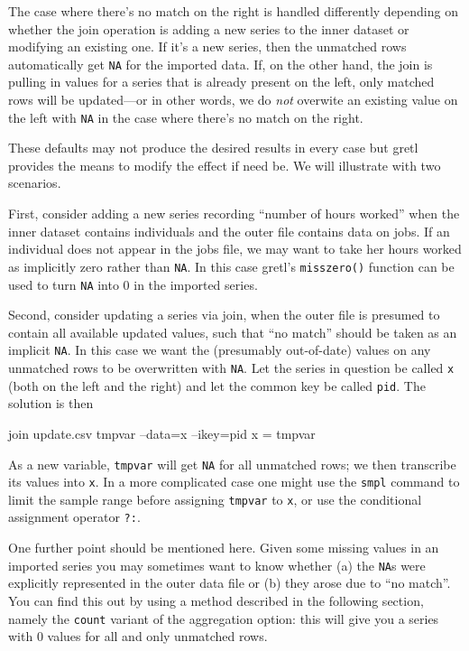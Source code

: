 The case where there's no match on the right is handled differently
depending on whether the join operation is adding a new series to the
inner dataset or modifying an existing one. If it's a new series, then
the unmatched rows automatically get \texttt{NA} for the imported
data. If, on the other hand, the join is pulling in values for a
series that is already present on the left, only matched rows will be
updated---or in other words, we do \textit{not} overwite an existing
value on the left with \texttt{NA} in the case where there's no match
on the right.

These defaults may not produce the desired results in every case but
gretl provides the means to modify the effect if need be.  We will
illustrate with two scenarios.

First, consider adding a new series recording ``number of hours
worked'' when the inner dataset contains individuals and the outer
file contains data on jobs. If an individual does not appear in the
jobs file, we may want to take her hours worked as implicitly zero
rather than \texttt{NA}. In this case gretl's \texttt{misszero()}
function can be used to turn \texttt{NA} into 0 in the imported
series.

Second, consider updating a series via join, when the outer file is
presumed to contain all available updated values, such that ``no
match'' should be taken as an implicit \texttt{NA}. In this case we
want the (presumably out-of-date) values on any unmatched rows to be
overwritten with \texttt{NA}. Let the series in question be called
\texttt{x} (both on the left and the right) and let the common key be
called \texttt{pid}. The solution is then
\begin{code}
join update.csv tmpvar --data=x --ikey=pid
x = tmpvar
\end{code}
As a new variable, \texttt{tmpvar} will get \texttt{NA} for all
unmatched rows; we then transcribe its values into \texttt{x}.  In a
more complicated case one might use the \texttt{smpl} command to limit
the sample range before assigning \texttt{tmpvar} to \texttt{x}, or
use the conditional assignment operator \texttt{?:}.

One further point should be mentioned here. Given some missing values
in an imported series you may sometimes want to know whether (a) 
the \texttt{NA}s were explicitly represented in the outer data file or
(b) they arose due to ``no match''. You can find this out by using
a method described in the following section, namely the \texttt{count}
variant of the aggregation option: this will give you a series with 0
values for all and only unmatched rows.

